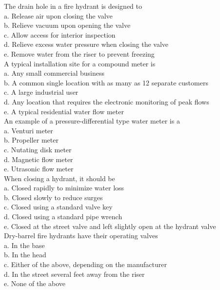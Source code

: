 The drain hole in a fire hydrant is designed to\\
a. Release air upon closing the valve\\

b. Relieve vacuum upon opening the valve\\

c. Allow access for interior inspection\\

d. Relieve excess water pressure when closing the valve\\

e. Remove water from the riser to prevent freezing\\


A typical installation site for a compound meter is\\
a. Any small commercial business\\

b. A common single location with as many as 12 separate customers\\

c. A large industrial user\\

d. Any location that requires the electronic monitoring of peak flows\\

e. A typical residential water flow meter \\

An example of a pressure-differential type water meter is a\\
a. Venturi meter\\
b. Propeller meter\\
c. Nutating disk meter\\
d. Magnetic flow meter\\
e. Utrasonic flow meter\\


  When closing a hydrant, it should be\\
a. Closed rapidly to minimize water loss\\
b. Closed slowly to reduce surges\\
c. Closed using a standard valve key\\
d. Closed using a standard pipe wrench\\
e. Closed at the street valve and left slightly open at the hydrant valve\\

  Dry-barrel fire hydrants have their operating valves\\
a. In the base\\
b. In the head\\
c. Either of the above, depending on the manufacturer\\
d. In the street several feet away from the riser\\
e. None of the above\\

